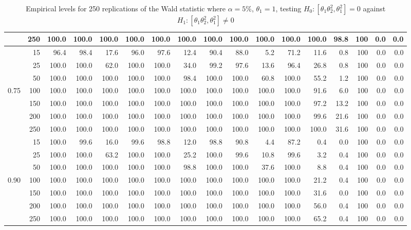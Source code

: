 \documentclass[11pt]{article}\usepackage[]{graphicx}\usepackage[]{color}
\begin{document}
\begin{table}[H]
{\begin{tabular}{|r|r|r|r|r|r|r|r|r|r|r|r|r|r|r|r|r|}
			& 250 & 100.0 & 100.0 & 100.0 & 100.0 & 100.0 & 100.0 & 100.0 & 100.0 & 100.0 & 100.0 & 100.0 & 98.8 & 100 & 0.0 & 0.0 \\
			\hline
			& 15 & 96.4 & 98.4 & 17.6 & 96.0 & 97.6 & 12.4 & 90.4 & 88.0 & 5.2 & 71.2 & 11.6 & 0.8 & 100 & 0.0 & 0.0 \\
			& 25 & 100.0 & 100.0 & 62.0 & 100.0 & 100.0 & 34.0 & 99.2 & 97.6 & 13.6 & 96.4 & 26.8 & 0.8 & 100 & 0.0 & 0.0 \\
			& 50 & 100.0 & 100.0 & 100.0 & 100.0 & 100.0 & 98.4 & 100.0 & 100.0 & 60.8 & 100.0 & 55.2 & 1.2 & 100 & 0.0 & 0.0 \\
			0.75 & 100 & 100.0 & 100.0 & 100.0 & 100.0 & 100.0 & 100.0 & 100.0 & 100.0 & 100.0 & 100.0 & 91.6 & 6.0 & 100 & 0.0 & 0.0 \\
			& 150 & 100.0 & 100.0 & 100.0 & 100.0 & 100.0 & 100.0 & 100.0 & 100.0 & 100.0 & 100.0 & 97.2 & 13.2 & 100 & 0.0 & 0.0 \\
			& 200 & 100.0 & 100.0 & 100.0 & 100.0 & 100.0 & 100.0 & 100.0 & 100.0 & 100.0 & 100.0 & 99.6 & 21.6 & 100 & 0.0 & 0.0 \\
			& 250 & 100.0 & 100.0 & 100.0 & 100.0 & 100.0 & 100.0 & 100.0 & 100.0 & 100.0 & 100.0 & 100.0 & 31.6 & 100 & 0.0 & 0.0 \\
			\hline
			& 15 & 100.0 & 99.6 & 16.0 & 99.6 & 98.8 & 12.0 & 98.8 & 90.8 & 4.4 & 87.2 & 0.4 & 0.0 & 100 & 0.0 & 0.0 \\
			& 25 & 100.0 & 100.0 & 63.2 & 100.0 & 100.0 & 25.2 & 100.0 & 99.6 & 10.8 & 99.6 & 3.2 & 0.4 & 100 & 0.0 & 0.0 \\
			& 50 & 100.0 & 100.0 & 100.0 & 100.0 & 100.0 & 98.8 & 100.0 & 100.0 & 37.6 & 100.0 & 8.8 & 0.4 & 100 & 0.0 & 0.0 \\
			0.90 & 100 & 100.0 & 100.0 & 100.0 & 100.0 & 100.0 & 100.0 & 100.0 & 100.0 & 100.0 & 100.0 & 21.2 & 0.4 & 100 & 0.0 & 0.0 \\
			& 150 & 100.0 & 100.0 & 100.0 & 100.0 & 100.0 & 100.0 & 100.0 & 100.0 & 100.0 & 100.0 & 31.6 & 0.0 & 100 & 0.0 & 0.0 \\
			& 200 & 100.0 & 100.0 & 100.0 & 100.0 & 100.0 & 100.0 & 100.0 & 100.0 & 100.0 & 100.0 & 56.0 & 0.4 & 100 & 0.0 & 0.0 \\
			& 250 & 100.0 & 100.0 & 100.0 & 100.0 & 100.0 & 100.0 & 100.0 & 100.0 & 100.0 & 100.0 & 65.2 & 0.4 & 100 & 0.0 & 0.0 \\
			\hline
		\end{tabular}
	}
	\caption{Empirical levels for 250 replications of the Wald statistic where $\alpha = 5\%$, $\theta_1=1$, testing $H_0: \left[ \theta_1\theta_2^2, \theta_1^2\right] =0$ against $H_1: \left[ \theta_1\theta_2^2, \theta_1^2\right] \neq 0$}
	\label{tbl:W:16}
\end{table}
\end{document}
